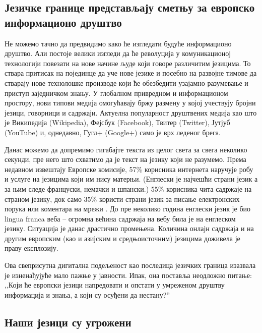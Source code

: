 {\begin{multicols}{2}
\subsection {Језичке границе представљају сметњу за европско информационо друштво}
  
Не можемо тачно да предвидимо како ће изгледати будуће информационо друштво. Али постоје велики изгледи да ће револуција у комуникационој технологији повезати на нове начине људе који говоре различитим језицима. То ствара притисак на појединце да уче нове језике и посебно на развојне тимове да стварају нове технолошке производе који ће обезбедити узајамно разумевање и приступ заједничком знању. У глобалном привредном и информационом простору, нови типови медија омогућавају бржу размену у којој учествују бројни језици, говорници и садржаји. Актуелна популарност друштвених медија као што је Википедија (Wikipedia), Фејсбук (Facebook), Твитер (Twitter), Јутјуб (YouTube) и, однедавно, Гугл+ (Google+) само је  врх леденог брега. 


Данас можемо да допремимо гигабајте текста из целог света за свега неколико секунди, пре него што схватимо да је текст на језику који не разумемо. Према недавном извештају Европске комисије, 57\% корисника интернета наручује робу и услуге на језицима који им нису матерњи. (Енглески је најчешћи страни језик а за њим следе француски, немачки и шпански.) 55\% корисника чита садржаје на страном језику, док само 35\% користи страни језик за писање електронских порука или коментара на мрежи  \cite{EC1}. До пре неколико година енглески језик је био lingua franca веба -- огромна већина садржаја на вебу била је на енглеском језику.  Ситуација је данас драстично промењена. Количина онлајн садржаја и на другим европским (као и азијским и средњоисточним) језицима доживела је праву експлозију. 

Ова свеприсутна дигитална подељеност као последица језичких граница изазвала је изненађујуће мало пажње у јавности. Ипак, она поставља неодложно питање: ,,Који ће европски језици напредовати и опстати у умреженом друштву информација и знања, а који су осуђени да нестану?''
 
\subsection {Наши језици су угрожени}
  

\end{multicols}}
